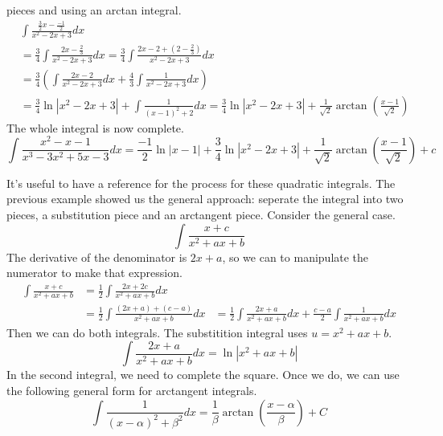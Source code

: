 \documentclass[fleqn]{report}
\begin{document}
\begin{example}
pieces and using an arctan integral. 
\begin{align*}
& \int \frac{\frac{3}{2} x - \frac{-1}{2}}{x^2 -
2x +3} dx \\
& = \frac{3}{4} \int \frac{2x - \frac{2}{3}}{x^2-2x+3}
dx = \frac{3}{4} \int \frac{2x - 2 + (2 - \frac{2}{3})}
{x^2-2x+3} dx \\
& = \frac{3}{4} \left( \int \frac{2x-2}{x^2-2x+3} dx +
\frac{4}{3} \int \frac{1}{x^2-2x+3} dx \right) \\
& = \frac{3}{4} \ln |x^2-2x+3| + \int \frac{1}{(x-1)^2 +2} dx =
\frac{3}{4} \ln |x^2-2x+3| + \frac{1}{\sqrt{2}} \arctan \left(
\frac{x-1}{\sqrt{2}} \right) 
\end{align*}
The whole integral is now complete.
\begin{equation*}
\int \frac{x^2-x-1}{x^3-3x^2+5x-3} dx = \frac{-1}{2} \ln |x-1| +
\frac{3}{4} \ln |x^2-2x+3| + \frac{1}{\sqrt{2}} \arctan \left(
\frac{x-1}{\sqrt{2}} \right) + c 
\end{equation*}
\end{example}

It's useful to have a reference for the process for these
quadratic integrals. The previous example showed us the general
approach: seperate the integral into two pieces, a
substitution piece and an arctangent piece. Consider the
general case.
\begin{equation*}
\int \frac{x + c}{x^2 + ax + b}
\end{equation*}
The derivative of the denominator is $2x + a$, so we can to
manipulate the numerator to make that expression.
\begin{align*}
\int \frac{x + c}{x^2 + ax + b} & = \frac{1}{2} \int \frac{2x +
2c}{x^2 + ax + b} dx \\
& = \frac{1}{2} \int \frac{(2x + a) + (c-a)}{x^2 + ax + b} dx 
& = \frac{1}{2} \int \frac{2x+a}{x^2 + ax+ b} dx + \frac{c-a}{2}
\int \frac{1}{x^2 + ax + b} dx
\end{align*}
Then we can do both integrals. The substitition integral uses
$u = x^2 + ax + b$.
\begin{equation*}
\int \frac{2x + a}{x^2 + ax + b} dx = \ln |x^2 + ax + b|
\end{equation*}
In the second integral, we need to complete the square. Once
we do, we can use the following general form for arctangent
integrals.
\begin{equation*}
\int \frac{1}{(x-\alpha)^2 + \beta^2} dx = \frac{1}{\beta}
\arctan \left( \frac{x-\alpha}{\beta} \right) + C
\end{equation*}
\end{document}
